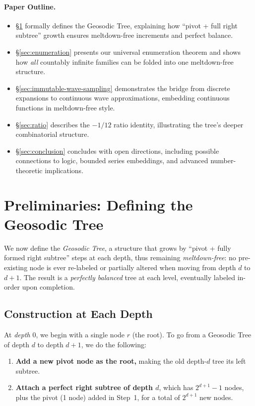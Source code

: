 \documentclass[11pt]{article}
\theoremstyle{definition}
\theoremstyle{remark}
\begin{document}
\paragraph{Paper Outline.}
\begin{itemize}
  \item \S\ref{sec:prelim} formally defines the Geosodic Tree, explaining how “pivot + full 
        right subtree” growth ensures meltdown-free increments and perfect balance.
  \item \S\ref{sec:enumeration} presents our universal enumeration theorem and shows how 
        \emph{all} countably infinite families can be folded into one meltdown-free structure.
  \item \S\ref{sec:immutable-wave-sampling} demonstrates the bridge from discrete expansions 
        to continuous wave approximations, embedding continuous functions in meltdown-free style.
  \item \S\ref{sec:ratio} describes the $-1/12$ ratio identity, illustrating the tree’s 
        deeper combinatorial structure.
  \item \S\ref{sec:conclusion} concludes with open directions, including possible connections 
        to logic, bounded series embeddings, and advanced number-theoretic implications.
\end{itemize}
 \section{Preliminaries: Defining the Geosodic Tree}
\label{sec:prelim}

We now define the \emph{Geosodic Tree}, a structure that grows by 
``pivot + fully formed right subtree'' steps at each depth, 
thus remaining \emph{meltdown-free}: 
no pre-existing node is ever re-labeled or partially altered when moving 
from depth $d$ to $d+1$. The result is a \emph{perfectly balanced} tree 
at each level, eventually labeled in-order upon completion.

\subsection{Construction at Each Depth}
\label{subsec:construction}

At \emph{depth} $0$, we begin with a single node $r$ (the root). To go from a Geosodic Tree
of depth $d$ to depth $d+1$, we do the following:

\begin{enumerate}
  \item \textbf{Add a new pivot node as the root,} making the old depth-$d$ tree its left subtree.
  \item \textbf{Attach a perfect right subtree of depth $d$}, which has $2^{d+1}-1$ nodes,
        plus the pivot (1 node) added in Step~1, for a total of $2^{d+1}$ new nodes.
\end{enumerate}
\end{document}
